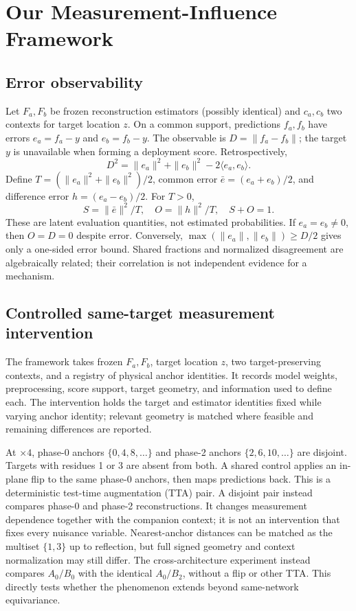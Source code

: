 \documentclass[10pt,twocolumn,letterpaper]{article}
\begin{document}
\section{Our Measurement-Influence Framework}
\subsection{Error observability}
Let $F_a,F_b$ be frozen reconstruction estimators (possibly identical) and $c_a,c_b$ two contexts for target location $z$. On a common support, predictions $f_a,f_b$ have errors $e_a=f_a-y$ and $e_b=f_b-y$. The observable is $D=\|f_a-f_b\|$; the target $y$ is unavailable when forming a deployment score. Retrospectively,
\begin{equation}
D^2=\|e_a\|^2+\|e_b\|^2-2\langle e_a,e_b\rangle .\label{eq:difference}
\end{equation}
Define $T=(\|e_a\|^2+\|e_b\|^2)/2$, common error $\bar e=(e_a+e_b)/2$, and difference error $h=(e_a-e_b)/2$. For $T>0$,
\begin{equation}
S=\|\bar e\|^2/T,\quad O=\|h\|^2/T,\quad S+O=1.\label{eq:energy}
\end{equation}
These are latent evaluation quantities, not estimated probabilities. If $e_a=e_b\ne0$, then $O=D=0$ despite error. Conversely, $\max(\|e_a\|,\|e_b\|)\ge D/2$ gives only a one-sided error bound. Shared fractions and normalized disagreement are algebraically related; their correlation is not independent evidence for a mechanism.

\subsection{Controlled same-target measurement intervention}
The framework takes frozen $F_a,F_b$, target location $z$, two target-preserving contexts, and a registry of physical anchor identities. It records model weights, preprocessing, score support, target geometry, and information used to define each. The intervention holds the target and estimator identities fixed while varying anchor identity; relevant geometry is matched where feasible and remaining differences are reported.

At $\times4$, phase-0 anchors $\{0,4,8,\ldots\}$ and phase-2 anchors $\{2,6,10,\ldots\}$ are disjoint. Targets with residues 1 or 3 are absent from both. A shared control applies an in-plane flip to the same phase-0 anchors, then maps predictions back. This is a deterministic test-time augmentation (TTA) pair. A disjoint pair instead compares phase-0 and phase-2 reconstructions. It changes measurement dependence together with the companion context; it is not an intervention that fixes every nuisance variable. Nearest-anchor distances can be matched as the multiset $\{1,3\}$ up to reflection, but full signed geometry and context normalization may still differ. The cross-architecture experiment instead compares $A_0/B_0$ with the identical $A_0/B_2$, without a flip or other TTA. This directly tests whether the phenomenon extends beyond same-network equivariance.
\end{document}
